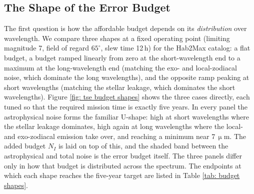 \documentclass[12pt,a4paper]{article}
\numberwithin{equation}{section}
\numberwithin{figure}{section}
\numberwithin{table}{section}
\begin{document}
\subsection{The Shape of the Error Budget}
The first question is how the affordable budget depends on its \textit{distribution} over wavelength. We compare three shapes at a fixed operating point (limiting magnitude 7, field of regard $65^\circ$, slew time 12\,h) for the Hab2Max catalog: a flat budget, a budget ramped linearly from zero at the short-wavelength end to a maximum at the long-wavelength end (matching the exo- and local-zodiacal noise, which dominate the long wavelengths), and the opposite ramp peaking at short wavelengths (matching the stellar leakage, which dominates the short wavelengths). Figure \ref{fig: tse budget shapes} shows the three cases directly, each tuned so that the required mission time is exactly five years. In every panel the astrophysical noise forms the familiar U-shape: high at short wavelengths where the stellar leakage dominates, high again at long wavelengths where the local- and exo-zodiacal emission take over, and reaching a minimum near 7\,$\upmu$m. The added budget $N_I$ is laid on top of this, and the shaded band between the astrophysical and total noise is the error budget itself. The three panels differ only in how that budget is distributed across the spectrum. The endpoints at which each shape reaches the five-year target are listed in Table \ref{tab: budget shapes}.
\end{document}
